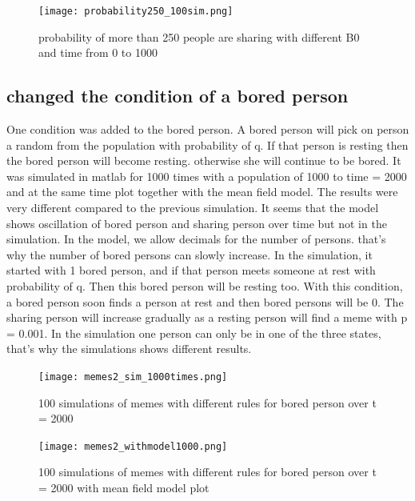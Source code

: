 \documentclass[12pt]{article}
\begin{document}
{\begin{figure}[H] %
\centering
\texttt{[image: probability250\_100sim.png]}
\caption{probability of more than 250 people are sharing with different B0 and time from 0 to 1000}
\label{fig:probability250}
\end{figure}

\newpage



\subsection{changed the condition of a bored person}
One condition was added to the bored person. A bored person will pick on person a random from the population with probability of q. If that person is resting then the bored person will become resting. otherwise she will continue to be bored. It was simulated in matlab for 1000 times with a population of 1000 to time = 2000 and at the same time plot together with the mean field model. The results were very different compared to the previous simulation. It seems that the model shows oscillation of bored person and sharing person over time but not in the simulation. In the model, we allow decimals for the number of persons. that's why the number of bored persons can slowly increase. In the simulation, it started with 1 bored person, and if that person meets someone at rest with probability of q. Then this bored person will be resting too. With this condition, a bored person soon finds a person at rest and then bored persons will be 0. The sharing person will increase gradually as a resting person will find a meme with p = 0.001. In the simulation one person can only be in one of the three states, that's why the simulations shows different results. 

\begin{figure}[H] %
\centering
\texttt{[image: memes2\_sim\_1000times.png]}
\caption{100 simulations of memes with different rules for bored person over t = 2000  }
\label{fig:meme2sim1000}
\end{figure}

\begin{figure}[H] %
\centering
\texttt{[image: memes2\_withmodel1000.png]}
\caption{100 simulations of memes with different rules for bored person over t = 2000  with mean field model plot}
\label{fig:meme2sim1000model}
\end{figure}

}
\end{document}
